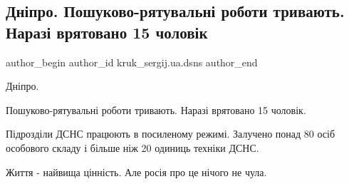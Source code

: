  
 
 
 
 

\subsection{Дніпро.  Пошуково-рятувальні роботи тривають. Наразі врятовано 15 чоловік}
\label{sec:14_01_2023.fb.kruk_sergij.ua.dsns.1.dn_pro___poshukovo_r}

\ifcmt
 author_begin
   author_id kruk_sergij.ua.dsns
 author_end
\fi

Дніпро. 

Пошуково-рятувальні роботи тривають. Наразі врятовано 15 чоловік.

Підрозділи ДСНС працюють в посиленому режимі. Залучено понад 80 осіб особового
складу і більше ніж 20 одиниць техніки ДСНС.

Життя - найвища цінність. Але росія про це нічого не чула.
